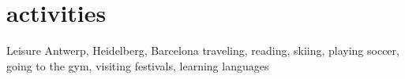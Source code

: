 \documentclass[]{friggeri-cv}
\begin{document}
\section{activities}

\begin{entrylist}
  \entry
    {}
    {Leisure}
    {Antwerp, Heidelberg, Barcelona}
    {traveling, reading, skiing, playing soccer, going to the gym, visiting festivals, learning languages}
\end{entrylist}






\end{document}
